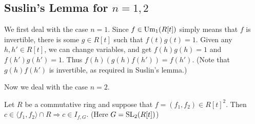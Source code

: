\subsection{Suslin's Lemma for $n=1,2$}

We first deal with the case $n=1$.
Since $f \in \text{Um}_1(R[t])$ simply means that $f$ is invertible, there is some $g \in R[t]$ such that $f(t) g(t) = 1$.
Given any $h,h' \in R[t]$, we can change variables, and get $f(h) g(h) = 1$ and $f(h') g(h') = 1$.
Thus $f(h) (g(h) f(h')) = f(h')$. (Note that $g(h) f(h')$ is invertible, as required in Suslin's lemma.)

Now we deal with the case $n=2$.

\begin{lemma}
\label{lemma:suslinbasecase}
  Let $R$ be a commutative ring and suppose that $f = (f_1, f_2) \in R[t]^2$.
  Then $c \in \langle f_1, f_2 \rangle \cap R \Rightarrow c \in I_{f,G}$. (Here $G = \text{SL}_2(R[t])$)
\end{lemma}
